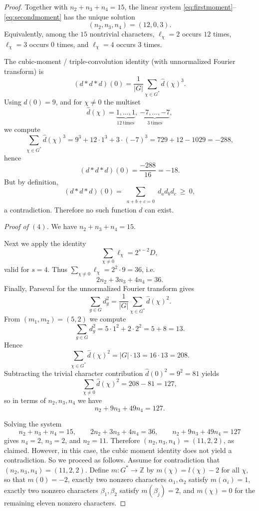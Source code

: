 \documentclass[12pt,twoside,]{amsart}
\theoremstyle{plain}
\theoremstyle{definition}
\begin{document}
\begin{proof}
Together with $n_2+n_3+n_4=15$, the linear system
\eqref{eq:firstmoment}--\eqref{eq:secondmoment} has the unique solution
\[
(n_2,n_3,n_4)=(12,0,3).
\]
Equivalently, among the $15$ nontrivial characters, $\ell_\chi=2$ occurs $12$ times,
$\ell_\chi=3$ occurs $0$ times, and $\ell_\chi=4$ occurs $3$ times.


The cubic-moment / triple-convolution identity (with unnormalized Fourier transform) is
\[
(d*d*d)(0)=\frac1{|G|}\sum_{\chi\in G^*}\widehat d(\chi)^3.
\]
Using $\widehat d(0)=9$, and for $\chi\neq 0$ the multiset
\[
\widehat d(\chi)=\underbrace{1,\dots,1}_{12\ \text{times}},\ \underbrace{-7,\dots,-7}_{3\ \text{times}},
\]
we compute
\[
\sum_{\chi\in G^*}\widehat d(\chi)^3
= 9^3 + 12\cdot 1^3 + 3\cdot(-7)^3
=729+12-1029=-288,
\]
hence
\[
(d*d*d)(0)=\frac{-288}{16}=-18.
\]
But by definition,
\[
(d*d*d)(0)=\sum_{\substack{a+b+c=0}} d_a d_b d_c \ \ge\ 0,
\]
a contradiction. Therefore no such function $d$ can exist.

\noindent\textit{Proof of $(4)$.} 
We have $n_2+n_3+n_4=15$. 

Next we apply the identity
\[
\sum_{\chi\neq 0}\ell_\chi = 2^{s-2}D,
\]
valid for $s=4$. Thus $\sum_{\chi\neq 0}\ell_\chi=2^{2}\cdot 9=36$, i.e.
\begin{equation}\label{eq:sum-l}
2n_2+3n_3+4n_4=36.
\end{equation}
Finally, Parseval for the unnormalized Fourier transform gives
\[
\sum_{g\in G} d_g^2=\frac{1}{|G|}\sum_{\chi\in G^*}\widehat d(\chi)^2.
\]
From $(m_1,m_2)=(5,2)$ we compute
\[
\sum_{g\in G} d_g^2 = 5\cdot 1^2 + 2\cdot 2^2 = 5+8=13.
\]
Hence
\[
\sum_{\chi\in G^*}\widehat d(\chi)^2 = |G|\cdot 13 = 16\cdot 13=208.
\]
Subtracting the trivial character contribution $\widehat d(0)^2=9^2=81$ yields
\[
\sum_{\chi\neq 0}\widehat d(\chi)^2 = 208-81=127,
\]
so in terms of $n_2,n_3,n_4$ we have
\begin{equation}\label{eq:parseval-n}
n_2+9n_3+49n_4=127.
\end{equation}

Solving the system
\[
n_2+n_3+n_4=15,\qquad
2n_2+3n_3+4n_4=36,\qquad
n_2+9n_3+49n_4=127
\]
gives $n_4=2$, $n_3=2$, and $n_2=11$. Therefore $(n_2,n_3,n_4)=(11,2,2)$, as claimed. However, in this case, the cubic moment identity does not yield a contradiction. So we proceed as follows.
Assume for contradiction that $(n_2,n_3,n_4)=(11,2,2)$.  Define
$m:G^*\to\mathbb Z$ by $m(\chi)=l(\chi)-2$ for all $\chi$, so that $m(0)=-2$,
exactly two nonzero characters $\alpha_1,\alpha_2$ satisfy $m(\alpha_i)=1$,
exactly two nonzero characters $\beta_1,\beta_2$ satisfy $m(\beta_j)=2$, and
$m(\chi)=0$ for the remaining eleven nonzero characters.


\end{proof}
\end{document}
